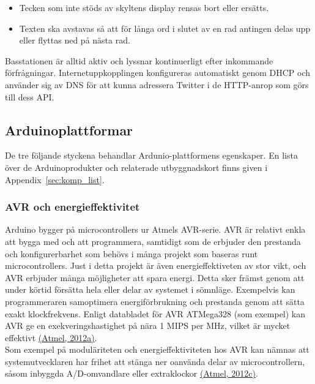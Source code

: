 \documentclass[a4paper,11pt]{article}
\begin{document}
	\begin{itemize}
    	\item Tecken som inte stöds av skyltens display rensas bort eller ersätts.
    	\item Texten ska avstavas så att för långa ord i slutet av en rad antingen delas upp eller flyttas ned på nästa rad.	
	\end{itemize}
	
Basstationen är alltid aktiv och lyssnar kontinuerligt efter inkommande förfrågningar. Internetuppkopplingen konfigureras automatiskt genom DHCP och använder sig av DNS för att kunna adressera Twitter i de HTTP-anrop som görs till dess API.

\subsection{Arduinoplattformar}

De tre följande styckena behandlar Ardunio-plattformens egenskaper. En lista över de Arduinoprodukter och relaterade utbyggnadskort finns given i Appendix~\ref{sec:komp_list}.

\subsubsection{AVR och energieffektivitet}
Arduino bygger på microcontrollers ur Atmels AVR-serie. AVR är relativt enkla att bygga med och att programmera, samtidigt som de erbjuder den prestanda och konfigurerbarhet som behövs i många projekt som baseras runt microcontrollers. Just i detta projekt är även energieffektiveten av stor vikt, och AVR erbjuder många möjligheter att spara energi. Detta sker främst genom att under körtid försätta hela eller delar av systemet i sömnläge. Exempelvis kan programmeraren samoptimera energiförbrukning och prestanda genom att sätta exakt klockfrekvens. Enligt databladet för AVR ATMega328 (som exempel) kan AVR ge en exekveringshastighet på nära 1 MIPS per MHz, vilket är mycket effektivt \hyperref[atmel]{(Atmel, 2012a)}. \\

Som exempel på moduläriteten och energieffektiviteten hos AVR kan nämnas att systemutvecklaren har frihet att stänga ner oanvända delar av microcontrollern, såsom inbyggda A/D-omvandlare eller extraklockor \hyperref[atmel]{(Atmel, 2012c)}.
\end{document}
